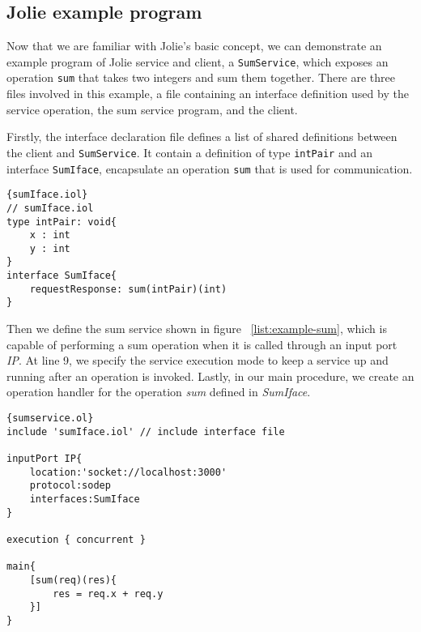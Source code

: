 \subsection{Jolie example program}

Now that we are familiar with Jolie's basic concept, we can demonstrate an example program of Jolie service and client, a \texttt{SumService}, which exposes an operation \texttt{sum} that takes two integers and sum them together. There are three files involved in this example, a file containing an interface definition used by the service operation, the sum service program, and the client.

Firstly, the interface declaration file defines a list of shared definitions between the client and \texttt{SumService}. It contain a definition of type \texttt{intPair} and an interface \texttt{SumIface}, encapsulate an operation \texttt{sum} that is used for communication.

\begin{listing}[ht]
    \lstset{language=Jolie,
        style=codeStyle
    }
    \begin{lstlisting}[frame=tlrb,caption={Sum service interface}, basicstyle=\footnotesize, label={list:example-iol}]{sumIface.iol}
// sumIface.iol
type intPair: void{
    x : int
    y : int
}
interface SumIface{
    requestResponse: sum(intPair)(int)
}
\end{lstlisting}
\end{listing}

Then we define the sum service shown in figure ~\ref{list:example-sum}, which is capable of performing a sum operation when it is called through an input port \textit{IP}. At line 9, we specify the service execution mode to keep a service up and running after an operation is invoked. Lastly, in our main procedure, we create an operation handler for the operation \textit{sum} defined in \textit{SumIface}.

\begin{listing}[ht]
    \lstset{language=Jolie,
        style=codeStyle,
        numbers=left,
        firstnumber=1
    }
    \begin{lstlisting}[frame=tlrb,basicstyle=\footnotesize, caption= {Sum service}, label={list:example-sum} ]{sumservice.ol}
include 'sumIface.iol' // include interface file

inputPort IP{
    location:'socket://localhost:3000'
    protocol:sodep 
    interfaces:SumIface
}

execution { concurrent }

main{
    [sum(req)(res){
        res = req.x + req.y
    }]
}
\end{lstlisting}
\end{listing}

